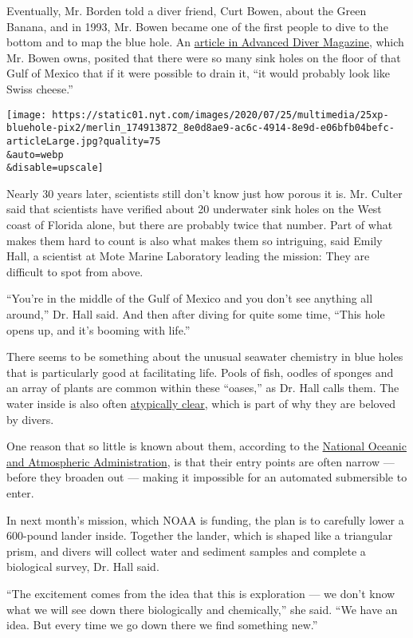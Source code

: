 Eventually, Mr. Borden told a diver friend, Curt Bowen, about the Green
Banana, and in 1993, Mr. Bowen became one of the first people to dive to
the bottom and to map the blue hole. An
\href{http://www.advanceddivermagazine.com/ADMEZINE/GreenBanana.pdf}{article
in Advanced Diver Magazine}, which Mr. Bowen owns, posited that there
were so many sink holes on the floor of that Gulf of Mexico that if it
were possible to drain it, ``it would probably look like Swiss cheese.''

\texttt{[image: https://static01.nyt.com/images/2020/07/25/multimedia/25xp-bluehole-pix2/merlin\_174913872\_8e0d8ae9-ac6c-4914-8e9d-e06bfb04befc-articleLarge.jpg?quality=75\\\&auto=webp\\\&disable=upscale]}

Nearly 30 years later, scientists still don't know just how porous it
is. Mr. Culter said that scientists have verified about 20 underwater
sink holes on the West coast of Florida alone, but there are probably
twice that number. Part of what makes them hard to count is also what
makes them so intriguing, said Emily Hall, a scientist at Mote Marine
Laboratory leading the mission: They are difficult to spot from above.

``You're in the middle of the Gulf of Mexico and you don't see anything
all around,'' Dr. Hall said. And then after diving for quite some time,
``This hole opens up, and it's booming with life.''

There seems to be something about the unusual seawater chemistry in blue
holes that is particularly good at facilitating life. Pools of fish,
oodles of sponges and an array of plants are common within these
``oases,'' as Dr. Hall calls them. The water inside is also often
\href{https://www.nytimes.com/2019/11/01/science/blue-holes-hurricanes.html}{atypically
clear}, which is part of why they are beloved by divers.

One reason that so little is known about them, according to the
\href{https://oceanexplorer.noaa.gov/explorations/20blue-holes/welcome.html}{National
Oceanic and Atmospheric Administration}, is that their entry points are
often narrow --- before they broaden out --- making it impossible for an
automated submersible to enter.

In next month's mission, which NOAA is funding, the plan is to carefully
lower a 600-pound lander inside. Together the lander, which is shaped
like a triangular prism, and divers will collect water and sediment
samples and complete a biological survey, Dr. Hall said.

``The excitement comes from the idea that this is exploration --- we
don't know what we will see down there biologically and chemically,''
she said. ``We have an idea. But every time we go down there we find
something new.''

